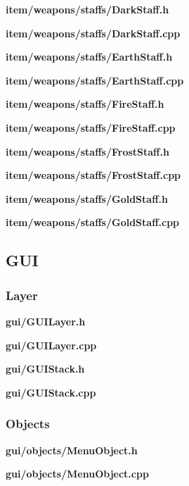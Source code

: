 \documentclass[../Main.tex]{subfiles}
\begin{document}
            \textbf{item/weapons/staffs/DarkStaff.h}
            
            \textbf{item/weapons/staffs/DarkStaff.cpp}
            

            \textbf{item/weapons/staffs/EarthStaff.h}
            
            \textbf{item/weapons/staffs/EarthStaff.cpp}
            

            \textbf{item/weapons/staffs/FireStaff.h}
            
            \textbf{item/weapons/staffs/FireStaff.cpp}
            

            \textbf{item/weapons/staffs/FrostStaff.h}
            
            \textbf{item/weapons/staffs/FrostStaff.cpp}
            

            \textbf{item/weapons/staffs/GoldStaff.h}
            
            \textbf{item/weapons/staffs/GoldStaff.cpp}
            

    \subsection{GUI}
        \subsubsection{Layer}
            \textbf{gui/GUILayer.h}
            
            \textbf{gui/GUILayer.cpp}
            

            \textbf{gui/GUIStack.h}
            
            \textbf{gui/GUIStack.cpp}
            

        \subsubsection{Objects}
            \textbf{gui/objects/MenuObject.h}
            
            \textbf{gui/objects/MenuObject.cpp}
            
\end{document}
